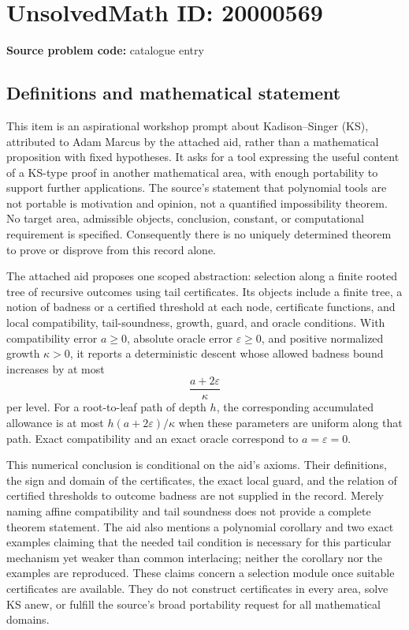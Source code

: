 \documentclass[11pt]{article}
\begin{document}
\section*{UnsolvedMath ID: 20000569}
\textbf{Source problem code:} catalogue entry
\subsection{Definitions and mathematical statement}
This item is an aspirational workshop prompt about Kadison--Singer (KS), attributed to Adam Marcus by the attached aid, rather than a mathematical proposition with fixed hypotheses. It asks for a tool expressing the useful content of a KS-type proof in another mathematical area, with enough portability to support further applications. The source's statement that polynomial tools are not portable is motivation and opinion, not a quantified impossibility theorem. No target area, admissible objects, conclusion, constant, or computational requirement is specified. Consequently there is no uniquely determined theorem to prove or disprove from this record alone.

The attached aid proposes one scoped abstraction: selection along a finite rooted tree of recursive outcomes using tail certificates. Its objects include a finite tree, a notion of badness or a certified threshold at each node, certificate functions, and local compatibility, tail-soundness, growth, guard, and oracle conditions. With compatibility error \(a\geq0\), absolute oracle error \(\varepsilon\geq0\), and positive normalized growth \(\kappa>0\), it reports a deterministic descent whose allowed badness bound increases by at most
\[
\frac{a+2\varepsilon}{\kappa}
\]
per level. For a root-to-leaf path of depth \(h\), the corresponding accumulated allowance is at most \(h(a+2\varepsilon)/\kappa\) when these parameters are uniform along that path. Exact compatibility and an exact oracle correspond to \(a=\varepsilon=0\).

This numerical conclusion is conditional on the aid's axioms. Their definitions, the sign and domain of the certificates, the exact local guard, and the relation of certified thresholds to outcome badness are not supplied in the record. Merely naming affine compatibility and tail soundness does not provide a complete theorem statement. The aid also mentions a polynomial corollary and two exact examples claiming that the needed tail condition is necessary for this particular mechanism yet weaker than common interlacing; neither the corollary nor the examples are reproduced. These claims concern a selection module once suitable certificates are available. They do not construct certificates in every area, solve KS anew, or fulfill the source's broad portability request for all mathematical domains.
\end{document}
